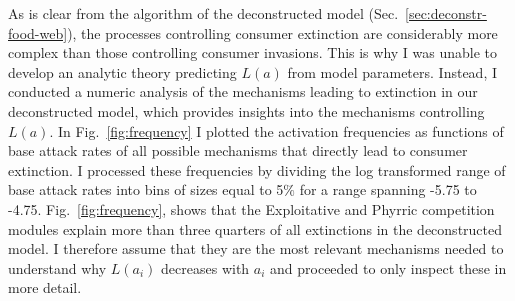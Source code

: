 \documentclass[a4paper]{report}
\begin{document}
{As is clear from the algorithm of the deconstructed model
(Sec.~\ref{sec:deconstr-food-web}), the processes controlling consumer
extinction are considerably more complex than those controlling
consumer invasions. This is why I was unable to develop an analytic
theory predicting $L(a)$ from model parameters. Instead, I conducted
a numeric analysis of the mechanisms leading to extinction in our
deconstructed model, which provides insights into the mechanisms
controlling $L(a)$. In Fig.~\ref{fig:frequency} I plotted the activation frequencies as functions of base attack rates of all possible mechanisms that directly lead to consumer extinction. I processed these frequencies by dividing the log transformed range of base attack rates into bins of sizes equal to 5$\%$ for a range spanning -5.75 to -4.75. Fig.~\ref{fig:frequency}, shows that the Exploitative and Phyrric competition modules explain more than three quarters of all extinctions in the deconstructed model. I therefore assume that they are the most relevant mechanisms needed to understand why $L(a_i)$ decreases with $a_i$ and proceeded to only inspect these in more detail.\\

\begin{figure}[H]


\end{figure}}
\end{document}
